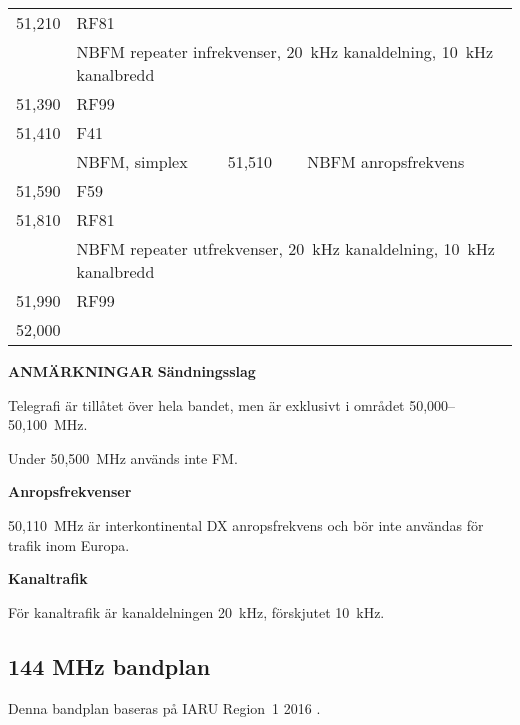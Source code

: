 \begin{longtable}{llll}
51,210 & RF81 & & \\
       & \multicolumn{3}{l}{NBFM repeater infrekvenser, 20~kHz kanaldelning, 10~kHz kanalbredd} \\
51,390 & RF99 & & \\ \hline

51,410 & F41 & & \\
       & NBFM, simplex & 51,510 & NBFM anropsfrekvens\\
51,590 & F59 & & \\ \hline

51,810 & RF81 & & \\
       & \multicolumn{3}{l}{NBFM repeater utfrekvenser, 20~kHz kanaldelning, 10~kHz kanalbredd} \\
51,990 & RF99 & & \\
52,000 & & & \\
\end{longtable}

\textbf{ANMÄRKNINGAR}
\textbf{Sändningsslag}

Telegrafi är tillåtet över hela bandet, men är exklusivt i området
50,000--50,100~MHz.

Under 50,500~MHz används inte FM.

\textbf{Anropsfrekvenser}

50,110~MHz är interkontinental DX anropsfrekvens och bör inte användas för
trafik inom Europa.

\textbf{Kanaltrafik}

För kanaltrafik är kanaldelningen 20~kHz, förskjutet 10~kHz.

\subsection{144 MHz bandplan}
\label{144MHzbandplan}
Denna bandplan baseras på IARU Region~1 2016 \cite{IARU1}.

